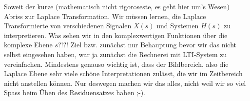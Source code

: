 \documentclass[11pt,a4paper,DIV=12]{scrartcl}
\numberwithin{equation}{section}
\numberwithin{figure}{section}
\newcommand{\red}{\textcolor{red}}
\begin{document}
Soweit der kurze (mathematisch nicht rigoroseste, es geht hier um's Wesen)
Abriss zur Laplace Transformation.
Wir müssen lernen, die Laplace Transformierte von verschiedenen
Signalen $X(s)$ und Systemen $H(s)$ zu interpretieren. Was sehen wir in den
komplexwertigen Funktionen über die komplexe Ebene $s$?!?!
Ziel bzw. zunächst nur Behauptung bevor wir das nicht selbst eingesehen haben,
war ja zunächst die Rechnerei mit LTI-System zu vereinfachen.
Mindestens genauso wichtig ist, dass der Bildbereich, also die Laplace Ebene
sehr viele schöne Interpretationen zulässt, die wir im Zeitbereich nicht
anstellen können. Nur deswegen machen wir das alles, nicht weil wir so viel
Spass beim Üben des Residuensatzes haben ;-).














\newpage
\end{document}
